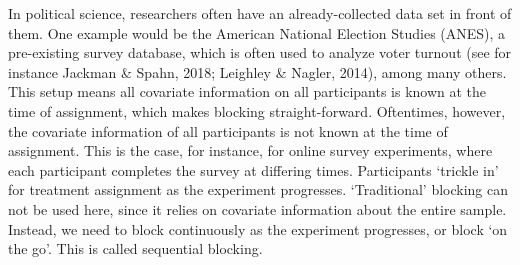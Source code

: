 \documentclass[12pt,econ]{sources/authesis}
\begin{document}
In political science, researchers often have an already-collected data set in front of them. One example would be the American National Election Studies (ANES), a pre-existing survey database, which is often used to analyze voter turnout (see for instance Jackman \& Spahn, 2018; Leighley \& Nagler, 2014), among many others. This setup means all covariate information on all participants is known at the time of assignment, which makes blocking straight-forward. Oftentimes, however, the covariate information of all participants is not known at the time of assignment. This is the case, for instance, for online survey experiments, where each participant completes the survey at differing times. Participants `trickle in' for treatment assignment as the experiment progresses. `Traditional' blocking can not be used here, since it relies on covariate information about the entire sample. Instead, we need to block continuously as the experiment progresses, or block `on the go'. This is called sequential blocking.
\end{document}
